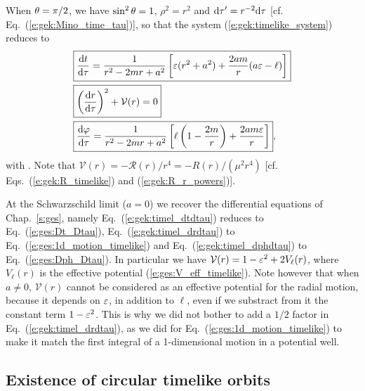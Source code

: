 When $\theta=\pi/2$, we have $\sin^2\theta=1$, $\rho^2 = r^2$ and $\mathrm{d}\tau' = r^{-2}\mathrm{d}\tau$
[cf. Eq.~(\ref{e:gek:Mino_time_tau})], so that the system
(\ref{e:gek:timelike_system}) reduces to
\begin{subequations}
\label{e:gek:equat_time_system}
\begin{align}
& \fbox{$\displaystyle  \frac{\mathrm{d} t}{\mathrm{d}\tau} = \frac{1}{r^2 - 2 m r + a^2} \left[
    \varepsilon(r^2 + a^2) + \frac{2 a m}{r} (a\varepsilon - \ell) \right] $} \label{e:gek:timel_dtdtau} \\
& \fbox{$\displaystyle  \left( \frac{\mathrm{d} r}{\mathrm{d} \tau} \right) ^2 + \mathcal{V}(r) = 0 $}\label{e:gek:timel_drdtau} \\
& \fbox{$\displaystyle  \frac{\mathrm{d}\varphi}{\mathrm{d}\tau} = \frac{1}{r^2 - 2 m r + a^2} \left[
    \ell \left( 1 - \frac{2m}{r} \right)
    + \frac{2 am \varepsilon}{r} \right] $},  \label{e:gek:timel_dphdtau}
\end{align}
\end{subequations}
with
\be \label{e:gek:def_V_time_equat}
   .
\ee
Note that $\mathcal{V}(r) = - \mathcal{R}(r)/r^4 = - R(r) / (\mu^2 r^4)$ [cf. Eqs.~(\ref{e:gek:R_timelike}) and (\ref{e:gek:R_r_powers})].
\begin{remark}
At the Schwarzschild limit ($a=0$) we recover the differential equations of Chap.~\ref{s:ges},
namely Eq.~(\ref{e:gek:timel_dtdtau}) reduces to Eq.~(\ref{e:ges:Dt_Dtau}),
Eq.~(\ref{e:gek:timel_drdtau}) to Eq.~(\ref{e:ges:1d_motion_timelike}) and
Eq.~(\ref{e:gek:timel_dphdtau}) to Eq.~(\ref{e:ges:Dph_Dtau}). In particular
we have $\mathcal{V}(r) = 1 - \varepsilon^2 + 2 V_\ell(r)$, where $V_\ell(r)$
is the effective potential (\ref{e:ges:V_eff_timelike}). Note however that
when $a\neq 0$, $\mathcal{V}(r)$ cannot be considered as an effective
potential for the radial motion, because it depends on $\varepsilon$, in addition
to $\ell$, even if we substract from it the constant term $1 - \varepsilon^2$.
This is why we did not bother to add a $1/2$ factor in Eq.~(\ref{e:gek:timel_drdtau}),
as we did for Eq.~(\ref{e:ges:1d_motion_timelike}) to make it match
the first integral of a 1-dimensional motion in a potential well.
\end{remark}

\subsection{Existence of circular timelike orbits} \label{s:gek:existence_circ_orb}

